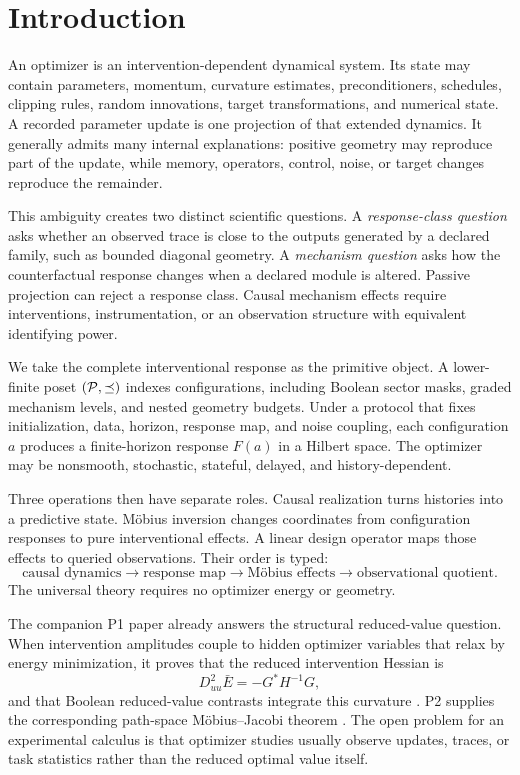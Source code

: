 \section{Introduction}
\label{sec:introduction}

An optimizer is an intervention-dependent dynamical system.  Its state may contain parameters, momentum, curvature estimates, preconditioners, schedules, clipping rules, random innovations, target transformations, and numerical state.  A recorded parameter update is one projection of that extended dynamics.  It generally admits many internal explanations: positive geometry may reproduce part of the update, while memory, operators, control, noise, or target changes reproduce the remainder.

This ambiguity creates two distinct scientific questions.  A \emph{response-class question} asks whether an observed trace is close to the outputs generated by a declared family, such as bounded diagonal geometry.  A \emph{mechanism question} asks how the counterfactual response changes when a declared module is altered.  Passive projection can reject a response class.  Causal mechanism effects require interventions, instrumentation, or an observation structure with equivalent identifying power.

We take the complete interventional response as the primitive object.  A lower-finite poset $(\mathcal P,\preceq)$ indexes configurations, including Boolean sector masks, graded mechanism levels, and nested geometry budgets.  Under a protocol that fixes initialization, data, horizon, response map, and noise coupling, each configuration $a$ produces a finite-horizon response $F(a)$ in a Hilbert space.  The optimizer may be nonsmooth, stochastic, stateful, delayed, and history-dependent.

Three operations then have separate roles.  Causal realization turns histories into a predictive state.  M\"obius inversion changes coordinates from configuration responses to pure interventional effects.  A linear design operator maps those effects to queried observations.  Their order is typed:
\[
\text{causal dynamics}\longrightarrow
\text{response map}\longrightarrow
\text{M\"obius effects}\longrightarrow
\text{observational quotient}.
\]
The universal theory requires no optimizer energy or geometry.

The companion P1 paper already answers the structural reduced-value question.  When intervention amplitudes couple to hidden optimizer variables that relax by energy minimization, it proves that the reduced intervention Hessian is
\[
D^2_{uu}\bar E=-G^*H^{-1}G,
\]
and that Boolean reduced-value contrasts integrate this curvature \citep{li2026optimizationgeometrodynamics}.  P2 supplies the corresponding path-space M\"obius--Jacobi theorem \citep{li2026restrictedcomplexity}.  The open problem for an experimental calculus is that optimizer studies usually observe updates, traces, or task statistics rather than the reduced optimal value itself.

